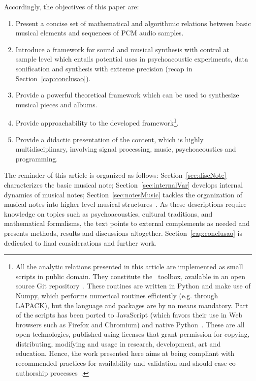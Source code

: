 Accordingly, the objectives of this paper are:
\begin{enumerate}
	\item Present a concise set of mathematical and algorithmic relations between basic musical elements and sequences of PCM audio samples.
	\item Introduce a framework for sound and musical synthesis with control at sample level which entails potential uses in psychoacoustic experiments, data sonification and synthesis with extreme precision (recap in Section~\ref{cap:conclusao}).
	\item Provide a powerful theoretical framework which can be used to synthesize musical pieces and albums.
	\item Provide approachability to the developed framework\footnote{All
		the analytic relations presented in this article are implemented as small scripts in public domain.
		They constitute the \massa\ toolbox, available in an open source Git repository~\cite{gitBook}.
		These routines are written in Python and make use of Numpy,
		which performs numerical routines efficiently (e.g. through LAPACK),
		but the language and packages are by no means mandatory.
		Part of the scripts has been ported to JavaScript
		(which favors their use in Web browsers such as Firefox and Chromium)
		and native Python~\cite{numpy, tutpython, python}.
		These are all open technologies, published using licenses 
		that grant permission for copying,
		distributing, modifying and usage in research, development, art and education.
		Hence, the work presented here aims at being compliant with recommended
		practices for availability and validation
		and should ease co-authorship processes~\cite{Raymond,Lessig}.}.
	\item Provide a didactic presentation of the content, which is highly multidisciplinary,
		involving signal processing, music, psychoacoustics and programming.
\end{enumerate}

The reminder of this article is organized as follows:
Section~\ref{sec:discNote} characterizes the basic musical note;
Section~\ref{sec:internalVar} develops internal dynamics of musical notes;
Section~\ref{sec:notesMusic} tackles the organization of musical notes into
higher level musical structures~\cite{Wisnick,Webern,Lerdahl,Cook,Lacerda,Zamacois,Schoenberg,microsound}.
As these descriptions require knowledge on topics such as psychoacoustics, cultural traditions,
and mathematical formalisms, the text points to external complements as needed
and presents methods, results and discussions altogether.
Section~\ref{cap:conclusao} is dedicated to final considerations and further work.


